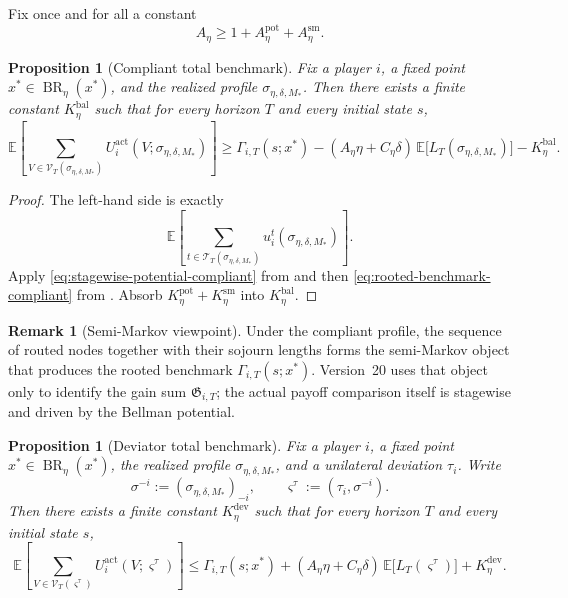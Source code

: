 \documentclass[12pt]{article}
\newtheorem{proposition}[theorem]{Proposition}
\theoremstyle{definition}
\newtheorem{remark}[theorem]{Remark}
\newcommand{\E}{\mathbb{E}}
\newcommand{\1}{\mathbf{1}}
\DeclareMathOperator{\BR}{BR}
\begin{document}
Fix once and for all a constant
\[
A_\eta\ge 1+A_\eta^{\mathrm{pot}}+A_\eta^{\mathrm{sm}}.
\]

\begin{proposition}[Compliant total benchmark]
\label{prop:routing-balance}
Fix a player $i$, a fixed point $x^*\in\BR_\eta(x^*)$, and the realized profile
$\sigma_{\eta,\delta,M_*}$. Then there exists a finite constant
$K_\eta^{\mathrm{bal}}$ such that for every horizon $T$ and every initial state
$s$,
\begin{equation}
\label{eq:routing-balance}
\E\left[
\sum_{V\in\mathcal V_T(\sigma_{\eta,\delta,M_*})}
U_i^{\mathrm{act}}(V;\sigma_{\eta,\delta,M_*})
\right]
\ge
\Gamma_{i,T}(s;x^*)
-
(A_\eta\eta+C_\eta\delta)\,
\E\bigl[L_T(\sigma_{\eta,\delta,M_*})\bigr]
-
K_\eta^{\mathrm{bal}}.
\end{equation}
\end{proposition}

\begin{proof}
The left-hand side is exactly
\[
\E\left[
\sum_{t\in\mathcal T_T(\sigma_{\eta,\delta,M_*})}
u_i^t(\sigma_{\eta,\delta,M_*})
\right].
\]
Apply \eqref{eq:stagewise-potential-compliant} from
 and then \eqref{eq:rooted-benchmark-compliant} from
. Absorb
$K_\eta^{\mathrm{pot}}+K_\eta^{\mathrm{sm}}$ into $K_\eta^{\mathrm{bal}}$.
\end{proof}

\begin{remark}[Semi-Markov viewpoint]
Under the compliant profile, the sequence of routed nodes together with their
sojourn lengths forms the semi-Markov object that produces the rooted benchmark
$\Gamma_{i,T}(s;x^*)$. Version~20 uses that object only to identify the gain sum
$\mathfrak G_{i,T}$; the actual payoff comparison itself is stagewise and driven
by the Bellman potential.
\end{remark}

\begin{proposition}[Deviator total benchmark]
\label{prop:deviation-total}
Fix a player $i$, a fixed point $x^*\in\BR_\eta(x^*)$, the realized profile
$\sigma_{\eta,\delta,M_*}$, and a unilateral deviation $\tau_i$. Write
\[
\sigma^{-i}:=(\sigma_{\eta,\delta,M_*})_{-i},
\qquad
\varsigma^\tau:=(\tau_i,\sigma^{-i}).
\]
Then there exists a finite constant $K_\eta^{\mathrm{dev}}$ such that for every
horizon $T$ and every initial state $s$,
\begin{equation}
\label{eq:deviation-total}
\E\left[
\sum_{V\in\mathcal V_T(\varsigma^\tau)}
U_i^{\mathrm{act}}(V;\varsigma^\tau)
\right]
\le
\Gamma_{i,T}(s;x^*)
+
(A_\eta\eta+C_\eta\delta)\,
\E\bigl[L_T(\varsigma^\tau)\bigr]
+
K_\eta^{\mathrm{dev}}.
\end{equation}
\end{proposition}
\end{document}
